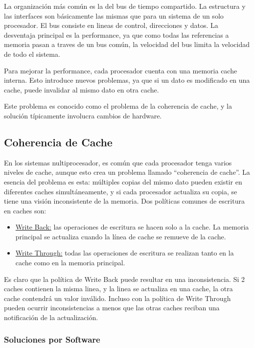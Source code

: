 La organizaci\'on m\'as com\'un es la del bus de tiempo compartido. La estructura y las interfaces son b\'asicamente las mismas que para un sistema
de un solo procesador. El bus consiste en lineas de control, direcciones y datos. La desventaja principal es la performance, ya que como todas las referencias
a memoria pasan a traves de un bus com\'un, la velocidad del bus limita la velocidad de todo el sistema.

Para mejorar la performance, cada procesador cuenta con una memoria cache interna. Esto introduce nuevos problemas, ya que si un dato es modificado en una cache, puede
invalidar al mismo dato en otra cache.

Este problema es conocido como el problema de la coherencia de cache, y la soluci\'on t\'ipicamente involucra cambios de hardware.

\subsection{Coherencia de Cache}

En los sistemas nultiprocesador, es com\'un que cada procesador tenga varios niveles de cache, aunque esto crea un problema llamado ``coherencia
de cache''. La esencia del problema es esta: m\'ultiples copias del mismo dato pueden existir en diferentes caches simult\'aneamente, y si cada
procesador actualiza su copia, se tiene una visi\'on inconsistente de la memoria. Dos pol\'iticas comunes de escritura en caches son:

\begin{itemize}
 \item \underline{Write Back:} las operaciones de escritura se hacen solo a la cache. La memoria principal se actualiza cuando la l\'inea de cache se
 remueve de la cache.
 \item \underline{Write Through:} todas las operaciones de escritura se realizan tanto en la cache como en la memoria principal.
\end{itemize}

Es claro que la pol\'itica de Write Back puede resultar en una inconsistencia. Si 2 caches contienen la misma linea, y la linea se actualiza
en una cache, la otra cache contendr\'a un valor inv\'alido. Incluso con la pol\'itica de Write Through pueden ocurrir inconsistencias a menos
que las otras caches reciban una notificaci\'on de la actualizaci\'on.

\subsubsection{Soluciones por Software}

